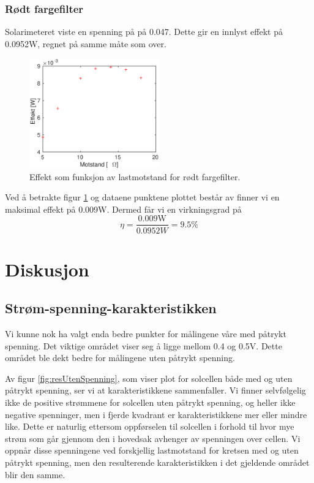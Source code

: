 \documentclass[a4paper,11pt, twocolumn]{article}
\begin{document}
\subsubsection{Rødt fargefilter}
Solarimeteret viste en spenning på på 0.047. Dette gir en innlyst effekt på 0.0952W, regnet på samme måte som over.
\begin{figure}[!ht]
	\includegraphics[width = 0.5\textwidth]{matlab/LAB/effektRed.eps}
	\caption{Effekt som funksjon av lastmotstand for rødt fargefilter.}
	\label{fig:effektRed}
\end{figure}
Ved å betrakte figur \ref{fig:effektRed} og dataene punktene plottet består av finner vi en maksimal effekt på 0.009W. Dermed får vi en virkningsgrad på 
\begin{equation}
	\eta = \frac{0.009\text{W}}{0.0952W} = 9.5\text{\%}
\end{equation}
\section{Diskusjon}
\subsection{Strøm-spenning-karakteristikken}
Vi kunne nok ha valgt enda bedre punkter for målingene våre med påtrykt spenning. Det viktige området viser seg å ligge mellom 0.4 og 0.5V. Dette området ble dekt bedre for målingene uten påtrykt spenning. 

Av figur \ref{fig:resUtenSpenning}, som viser plot for solcellen både med og uten påtrykt spenning, ser vi at karakteristikkene sammenfaller. Vi finner selvfølgelig ikke de positive strømmene for solcellen uten påtrykt spenning, og heller ikke negative spenninger, men i fjerde kvadrant er karakteristikkene mer eller mindre like. Dette er naturlig ettersom oppførselen til solcellen i forhold til hvor mye strøm som går gjennom den i hovedsak avhenger av spenningen over cellen. Vi oppnår disse spenningene ved forskjellig lastmotstand for kretsen med og uten påtrykt spenning, men den resulterende karakteristikken i det gjeldende området blir den samme.
\end{document}
